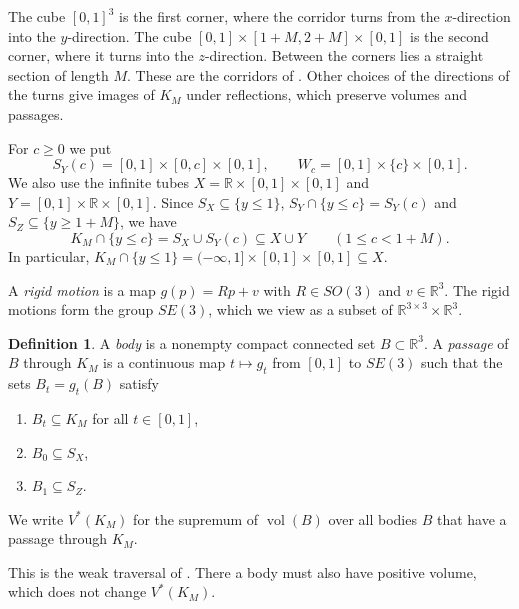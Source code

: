 \documentclass[11pt]{amsart}
\theoremstyle{definition}
\newtheorem{definition}[theorem]{Definition}
\theoremstyle{remark}
\numberwithin{equation}{section}
\newcommand{\R}{\mathbb{R}}
\newcommand{\vol}{\operatorname{vol}}
\begin{document}
The cube $[0,1]^3$ is the first corner, where the corridor turns from the $x$-direction into the $y$-direction. The cube $[0,1]\times[1+M,2+M]\times[0,1]$ is the second corner, where it turns into the $z$-direction. Between the corners lies a straight section of length $M$. These are the corridors of \cite[Definition~2.1]{Tan26a}. Other choices of the directions of the turns give images of $K_M$ under reflections, which preserve volumes and passages.

For $c\ge0$ we put
\[
S_Y(c)=[0,1]\times[0,c]\times[0,1],\qquad W_c=[0,1]\times\{c\}\times[0,1].
\]
We also use the infinite tubes $X=\R\times[0,1]\times[0,1]$ and $Y=[0,1]\times\R\times[0,1]$. Since $S_X\subseteq\{y\le1\}$, $S_Y\cap\{y\le c\}=S_Y(c)$ and $S_Z\subseteq\{y\ge1+M\}$, we have
\begin{equation}\label{eq:low}
K_M\cap\{y\le c\}=S_X\cup S_Y(c)\subseteq X\cup Y\qquad(1\le c<1+M).
\end{equation}
In particular, $K_M\cap\{y\le1\}=(-\infty,1]\times[0,1]\times[0,1]\subseteq X$.

A \emph{rigid motion} is a map $g(p)=Rp+v$ with $R\in SO(3)$ and $v\in\R^3$. The rigid motions form the group $SE(3)$, which we view as a subset of $\R^{3\times3}\times\R^3$.

\begin{definition}\label{def:passage}
A \emph{body} is a nonempty compact connected set $B\subset\R^3$. A \emph{passage} of $B$ through $K_M$ is a continuous map $t\mapsto g_t$ from $[0,1]$ to $SE(3)$ such that the sets $B_t=g_t(B)$ satisfy
\begin{enumerate}[label=(\roman*)]
\item\label{p:in} $B_t\subseteq K_M$ for all $t\in[0,1]$,
\item\label{p:start} $B_0\subseteq S_X$,
\item\label{p:end} $B_1\subseteq S_Z$.
\end{enumerate}
We write $V^*(K_M)$ for the supremum of $\vol(B)$ over all bodies $B$ that have a passage through $K_M$.
\end{definition}

This is the weak traversal of \cite[Definition~2.2]{Tan26a}. There a body must also have positive volume, which does not change $V^*(K_M)$.
\end{document}
